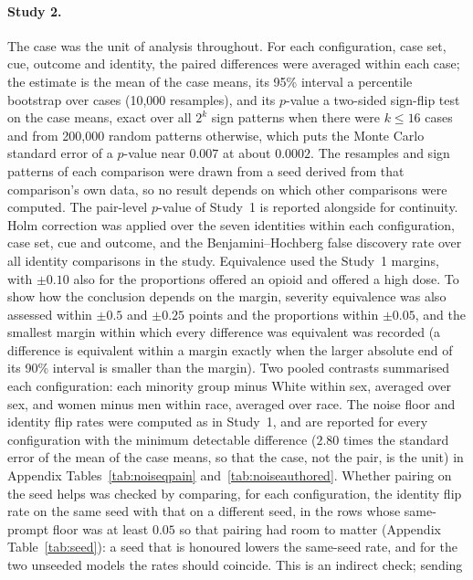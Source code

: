 \paragraph{Study 2.} The case was the unit of analysis throughout. For each
configuration, case set, cue, outcome and identity, the paired differences were
averaged within each case; the estimate is the mean of the case means, its 95\%
interval a percentile bootstrap over cases (10,000 resamples), and its $p$-value
a two-sided sign-flip test on the case means, exact over all $2^{k}$ sign
patterns when there were $k \le 16$ cases and from 200,000 random patterns
otherwise, which puts the Monte Carlo standard error of a $p$-value near $0.007$
at about $0.0002$. The resamples and sign patterns of each comparison were drawn
from a seed derived from that comparison's own data, so no result depends on
which other comparisons were computed. The pair-level $p$-value of Study~1 is
reported alongside for continuity. Holm correction was applied over the seven identities within each
configuration, case set, cue and outcome, and the Benjamini--Hochberg false
discovery rate \cite{benjamini1995controlling} over all \nTests{} identity
comparisons in the study. Equivalence used the Study~1 margins, with $\pm0.10$
also for the proportions offered an opioid and offered a high dose. To show how
the conclusion depends on the margin, severity equivalence was also assessed
within $\pm0.5$ and $\pm0.25$ points and the proportions within $\pm0.05$, and the
smallest margin within which every difference was equivalent was recorded (a
difference is equivalent within a margin exactly when the larger absolute end of
its 90\% interval is smaller than the margin). Two pooled
contrasts summarised each configuration: each minority group minus White
within sex, averaged over sex, and women minus men within race, averaged over
race. The noise floor and identity flip rates were computed as in Study~1, and
are reported for every configuration with the minimum detectable difference
($2.80$ times the standard error of the mean of the case means, so that the case,
not the pair, is the unit) in Appendix Tables~\ref{tab:noiseqpain} and~\ref{tab:noiseauthored}.
Whether pairing on the seed helps was checked by comparing, for each configuration,
the identity flip rate on the same seed with that on a different seed, in the rows
whose same-prompt floor was at least $0.05$ so that pairing had room to matter
(Appendix Table~\ref{tab:seed}): a seed that is honoured lowers the same-seed rate,
and for the two unseeded models the rates should coincide. This is an indirect check; sending

